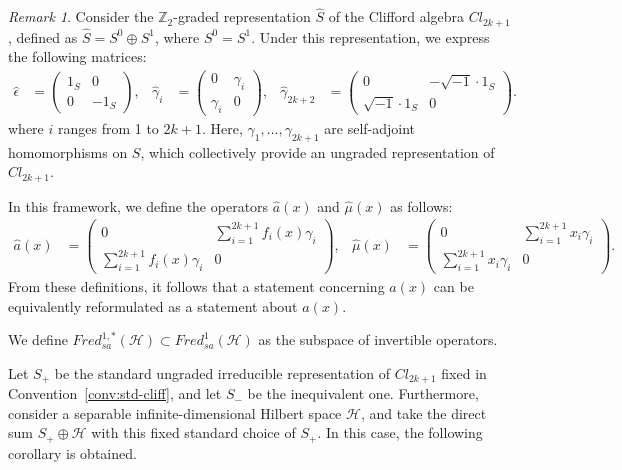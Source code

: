 \documentclass{amsart}
\theoremstyle{definition}
\theoremstyle{remark}
\newtheorem{rem}[thm]{Remark}
\begin{document}
\begin{rem}\label{rem:3}
Consider the $\mathbb{Z}_2$-graded representation $\hat{S}$ of the Clifford algebra $Cl_{2k+1}$, defined as $\hat{S} = S^0 \oplus S^1$, where $S^0 = S^1$. Under this representation, we express the following matrices:
\begin{align*}
\hat{\epsilon}&=\begin{pmatrix}
1_S & 0 \\
0 & -1_S
\end{pmatrix},&
\hat{\gamma}_i&=\begin{pmatrix}
0 & \gamma_i \\
\gamma_i & 0
\end{pmatrix},&
\hat{\gamma}_{2k+2}&=\begin{pmatrix}
0 & -\sqrt{-1}\cdot1_S \\
\sqrt{-1}\cdot1_S & 0
\end{pmatrix}.
\end{align*}
where $i$ ranges from 1 to $2k+1$. Here, $\gamma_1, \dots, \gamma_{2k+1}$ are self-adjoint homomorphisms on $S$, which collectively provide an ungraded representation of $Cl_{2k+1}$.

In this framework, we define the operators $\hat{a}(x)$ and $\hat{\mu}(x)$ as follows:
\begin{align*}
\hat{a}(x)&=\begin{pmatrix}
0 & \sum_{i=1}^{2k+1}f_i(x)\gamma_i \\
\sum_{i=1}^{2k+1}f_i(x)\gamma_i & 0
\end{pmatrix},&
\hat{\mu}(x)&=\begin{pmatrix}
0 & \sum_{i=1}^{2k+1}x_i\gamma_i \\
\sum_{i=1}^{2k+1}x_i\gamma_i & 0
\end{pmatrix}.
\end{align*}
From these definitions, it follows that a statement concerning $\hat{a}(x)$ can be equivalently reformulated as a statement about $a(x)$.
\end{rem}

We define $Fred_{sa}^{1,*}(\mathcal{H}) \subset Fred_{sa}^{1}(\mathcal{H})$ as the subspace of invertible operators.

Let $S_{+}$ be the standard ungraded irreducible representation of $Cl_{2k+1}$ fixed in Convention~\ref{conv:std-cliff}, and let $S_{-}$ be the inequivalent one. Furthermore, consider a separable infinite-dimensional Hilbert space $\mathcal{H}$, and take the direct sum $S_{+}\oplus \mathcal{H}$ with this fixed standard choice of $S_{+}$. In this case, the following corollary is obtained.
\end{document}
